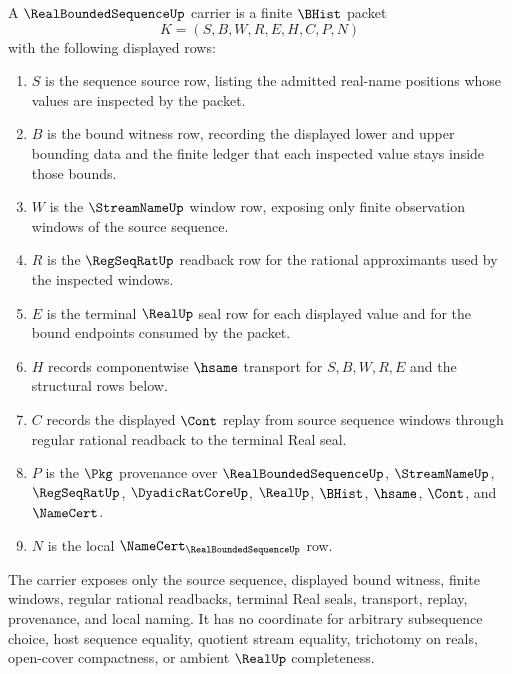 \begin{definition}
\label{def:real-bounded-sequence-carrier}
A $\RealBoundedSequenceUp$ carrier is a finite $\BHist$ packet
$$
K=(S,B,W,R,E,H,C,P,N)
$$
with the following displayed rows:
\begin{enumerate}
\item $S$ is the sequence source row, listing the admitted real-name positions whose values are inspected by the packet.
\item $B$ is the bound witness row, recording the displayed lower and upper bounding data and the finite ledger that each inspected value stays inside those bounds.
\item $W$ is the $\StreamNameUp$ window row, exposing only finite observation windows of the source sequence.
\item $R$ is the $\RegSeqRatUp$ readback row for the rational approximants used by the inspected windows.
\item $E$ is the terminal $\RealUp$ seal row for each displayed value and for the bound endpoints consumed by the packet.
\item $H$ records componentwise $\hsame$ transport for $S,B,W,R,E$ and the structural rows below.
\item $C$ records the displayed $\Cont$ replay from source sequence windows through regular rational readback to the terminal Real seal.
\item $P$ is the $\Pkg$ provenance over $\RealBoundedSequenceUp$, $\StreamNameUp$, $\RegSeqRatUp$, $\DyadicRatCoreUp$, $\RealUp$, $\BHist$, $\hsame$, $\Cont$, and $\NameCert$.
\item $N$ is the local $\NameCert_{\RealBoundedSequenceUp}$ row.
\end{enumerate}
The carrier exposes only the source sequence, displayed bound witness, finite windows, regular rational readbacks, terminal Real seals, transport, replay, provenance, and local naming. It has no coordinate for arbitrary subsequence choice, host sequence equality, quotient stream equality, trichotomy on reals, open-cover compactness, or ambient $\RealUp$ completeness.
\end{definition}

